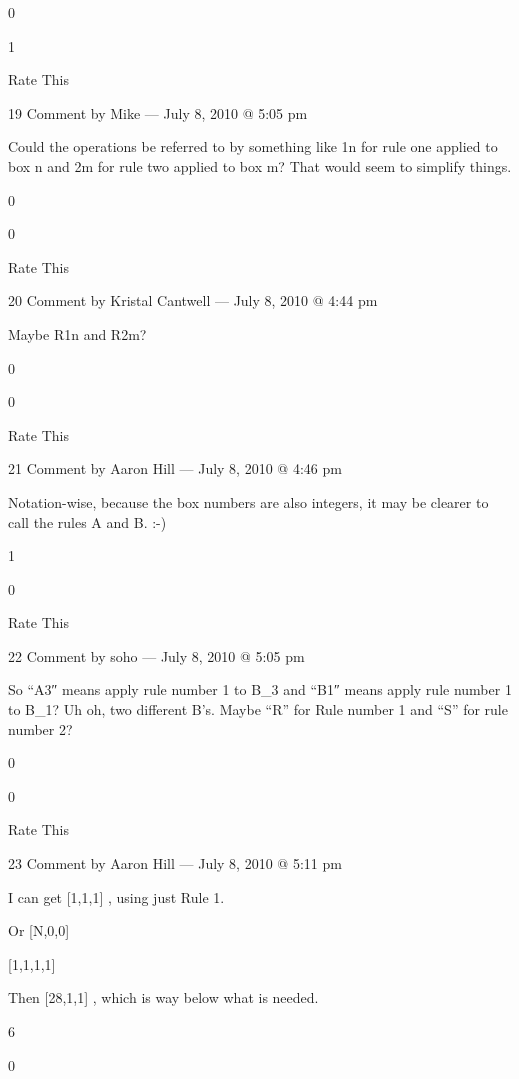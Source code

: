         0
         
        1
         
        Rate This

        19 Comment by Mike — July 8, 2010 @ 5:05 pm

    Could the operations be referred to by something like 1n for rule one applied to box n and 2m for rule two applied to box m?
    That would seem to simplify things.
     
    0
     
    0
     
    Rate This

    20 Comment by Kristal Cantwell — July 8, 2010 @ 4:44 pm

        Maybe R1n and R2m?
         
        0
         
        0
         
        Rate This

        21 Comment by Aaron Hill — July 8, 2010 @ 4:46 pm

        Notation-wise, because the box numbers are also integers, it may be clearer to call the rules A and B. :-)
         
        1
         
        0
         
        Rate This

        22 Comment by soho — July 8, 2010 @ 5:05 pm

            So “A3″ means apply rule number 1 to B_3 and “B1″ means apply rule number 1 to B_1? Uh oh, two different B’s. Maybe “R” for Rule number 1 and “S” for rule number 2?
             
            0
             
            0
             
            Rate This

            23 Comment by Aaron Hill — July 8, 2010 @ 5:11 pm

    I can get [1,1,1] \to [0,0,7], using just Rule 1.

    Or [N,0,0] \to [N-1,0,4] \to [N-2,0,8] \to \to [0,0,2^{N+1}]

    [1,1,1,1] \to [0,3,0,3] \to [0,2,0,7] \to [0,1,0,14] \to [0,0,0,28]

    Then [28,1,1] \to [27,0,7] \to [0,0,7*2^{27}], which is way below what is needed.
     
    6
     
    0
     

